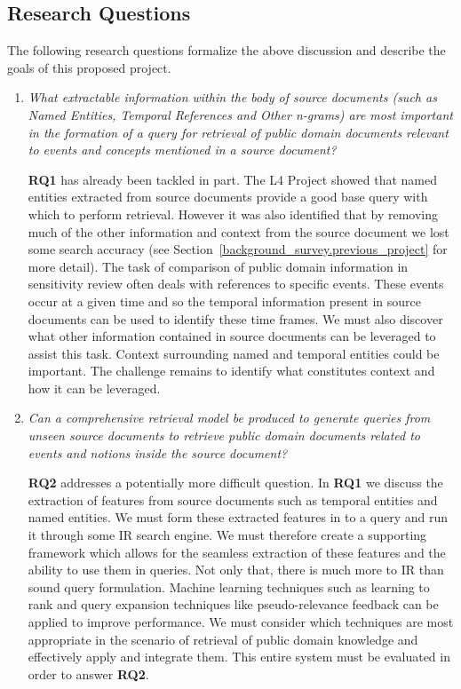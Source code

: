 \documentclass{mprop}
\begin{document}
\subsection{Research Questions}
The following research questions formalize the above discussion and describe the goals of this proposed project.
\begin{enumerate}[label=\textbf{RQ.\arabic*}]
\item \textit{What extractable information within the body of source documents (such as Named Entities, Temporal References and Other n-grams) are most important in the formation of a query for retrieval of public domain documents relevant to events and concepts mentioned in a source document? }

\textbf{RQ1} has already been tackled in part. 
The L4 Project showed that named entities extracted from source documents provide a good base query with which to perform retrieval. 
However it was also identified that by removing much of the other information and context from the source document we lost some search accuracy (see Section~\ref{background_survey.previous_project} for more detail). 
The task of comparison of public domain information in sensitivity review often deals with references to specific events. 
These events occur at a given time and so the temporal information present in source documents can be used to identify these time frames. 
We must also discover what other information contained in source documents can be leveraged to assist this task.
Context surrounding named and temporal entities could be important. 
The challenge remains to identify what constitutes context and how it can be leveraged.

\item \textit{Can a comprehensive retrieval model be produced to generate queries from unseen source documents to retrieve public domain documents related to events and notions inside the source document?}

\textbf{RQ2} addresses a potentially more difficult question. 
In \textbf{RQ1} we discuss the extraction of features from source documents such as temporal entities and named entities. 
We must form these extracted features in to a query and run it through some IR search engine. 
We must therefore create a supporting framework which allows for the seamless extraction of these features and the ability to use them in queries. 
Not only that, there is much more to IR than sound query formulation. 
Machine learning techniques such as learning to rank and query expansion techniques like pseudo-relevance feedback can be applied to improve performance. 
We must consider which techniques are most appropriate in the scenario of retrieval of public domain knowledge and effectively apply and integrate them. 
This entire system must be evaluated in order to answer \textbf{RQ2}.
\end{enumerate}
\end{document}
